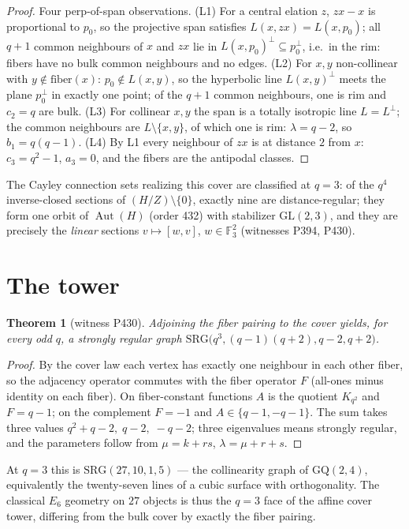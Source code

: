 \documentclass[11pt]{article}
\newtheorem{theorem}{Theorem}
\newcommand{\FF}{\mathbb F}
\begin{document}
\begin{proof}
Four perp-of-span observations. (L1) For a central elation $z$, $zx-x$ is
proportional to $p_0$, so the projective span satisfies
$L(x,zx)=L(x,p_0)$; all $q+1$ common neighbours of $x$ and $zx$ lie in
$L(x,p_0)^\perp\subseteq p_0^\perp$, i.e.\ in the rim: fibers have no bulk
common neighbours and no edges. (L2) For $x,y$ non-collinear with
$y\notin\mathrm{fiber}(x)$: $p_0\notin L(x,y)$, so the hyperbolic line
$L(x,y)^\perp$ meets the plane $p_0^\perp$ in exactly one point; of the $q+1$
common neighbours, one is rim and $c_2=q$ are bulk. (L3) For collinear $x,y$
the span is a totally isotropic line $L=L^\perp$; the common neighbours are
$L\setminus\{x,y\}$, of which one is rim: $\lambda=q-2$, so $b_1=q(q-1)$.
(L4) By L1 every neighbour of $zx$ is at distance $2$ from $x$:
$c_3=q^2-1$, $a_3=0$, and the fibers are the antipodal classes.
\end{proof}

The Cayley connection sets realizing this cover are classified at $q=3$: of
the $q^4$ inverse-closed sections of $(H/Z)\setminus\{0\}$, exactly nine are
distance-regular; they form one orbit of $\operatorname{Aut}(H)$ (order 432)
with stabilizer $\mathrm{GL}(2,3)$, and they are precisely the \emph{linear}
sections $v\mapsto[w,v]$, $w\in\FF_3^2$ (witnesses P394, P430).

\section{The tower}

\begin{theorem}[witness P430]
Adjoining the fiber pairing to the cover yields, for every odd $q$, a
strongly regular graph $\mathrm{SRG}\bigl(q^3,(q-1)(q+2),q-2,q+2\bigr)$.
\end{theorem}

\begin{proof}
By the cover law each vertex has exactly one neighbour in each other fiber, so
the adjacency operator commutes with the fiber operator $F$ (all-ones minus
identity on each fiber). On fiber-constant functions $A$ is the quotient
$K_{q^2}$ and $F=q-1$; on the complement $F=-1$ and
$A\in\{q-1,-q-1\}$. The sum takes three values
$q^2+q-2,\;q-2,\;-q-2$; three eigenvalues means strongly regular, and the
parameters follow from $\mu=k+rs$, $\lambda=\mu+r+s$.
\end{proof}

At $q=3$ this is $\mathrm{SRG}(27,10,1,5)$ --- the collinearity graph of
$\mathrm{GQ}(2,4)$, equivalently the twenty-seven lines of a cubic surface
with orthogonality. The classical $E_6$ geometry on $27$ objects is thus the
$q=3$ face of the affine cover tower, differing from the bulk cover by exactly
the fiber pairing.
\end{document}
